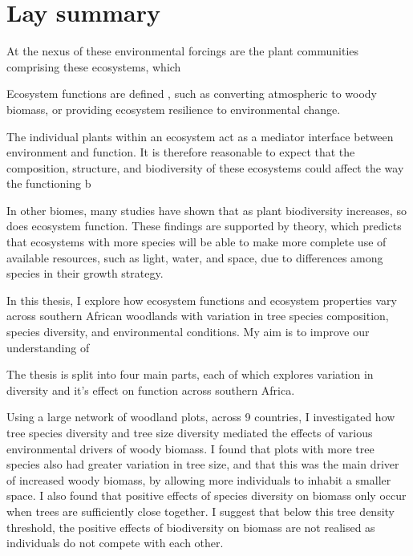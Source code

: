 \chapter*{Lay summary}
\label{lay}


At the nexus of these environmental forcings are the plant communities comprising these ecosystems, which 

Ecosystem functions are defined , such as converting atmospheric \co to woody biomass, or providing ecosystem resilience to environmental change. 

The individual plants within an ecosystem act as a mediator interface between environment and function. It is therefore reasonable to expect that the composition, structure, and biodiversity of these ecosystems could affect the way the functioning b

In other biomes, many studies have shown that as plant biodiversity increases, so does ecosystem function. These findings are supported by theory, which predicts that ecosystems with more species will be able to make more complete use of available resources, such as light, water, and space, due to differences among species in their growth strategy. 

In this thesis, I explore how ecosystem functions and ecosystem properties vary across southern African woodlands with variation in tree species composition, species diversity, and environmental conditions. My aim is to improve our understanding of 

The thesis is split into four main parts, each of which explores variation in diversity and it's effect on function across southern Africa.

Using a large network of woodland plots, across 9 countries, I investigated how tree species diversity and tree size diversity mediated the effects of various environmental drivers of woody biomass. I found that plots with more tree species also had greater variation in tree size, and that this was the main driver of increased woody biomass, by allowing more individuals to inhabit a smaller space. I also found that positive effects of species diversity on biomass only occur when trees are sufficiently close together. I suggest that below this tree density threshold, the positive effects of biodiversity on biomass are not realised as individuals do not compete with each other.

